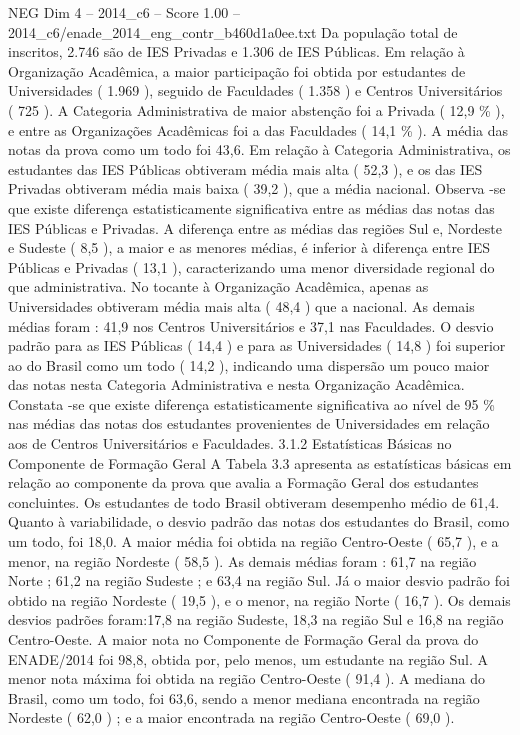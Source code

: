 \begin{textsample}{NEG Dim 4 – 2014\_c6 – Score 1.00 – 2014\_c6/enade\_2014\_eng\_contr\_b460d1a0ee.txt}
Da população total de inscritos, 2.746 são de IES Privadas e 1.306 de IES Públicas.
Em relação à Organização Acadêmica, a maior participação foi obtida por estudantes de Universidades ( 1.969 ), seguido de Faculdades ( 1.358 ) e Centros Universitários ( 725 ).
A Categoria Administrativa de maior abstenção foi a Privada ( 12,9 \% ), e entre as Organizações Acadêmicas foi a das Faculdades ( 14,1 \% ).
A média das notas da prova como um todo foi 43,6.
Em relação à Categoria Administrativa, os estudantes das IES Públicas obtiveram média mais alta ( 52,3 ), e os das IES Privadas obtiveram média mais baixa ( 39,2 ), que a média nacional.
Observa -se que existe diferença estatisticamente significativa entre as médias das notas das IES Públicas e Privadas.
A diferença entre as médias das regiões Sul e, Nordeste e Sudeste ( 8,5 ), a maior e as menores médias, é inferior à diferença entre IES Públicas e Privadas ( 13,1 ), caracterizando uma menor diversidade regional do que administrativa.
No tocante à Organização Acadêmica, apenas as Universidades obtiveram média mais alta ( 48,4 ) que a nacional.
As demais médias foram : 41,9 nos Centros Universitários e 37,1 nas Faculdades.
O desvio padrão para as IES Públicas ( 14,4 ) e para as Universidades ( 14,8 ) foi superior ao do Brasil como um todo ( 14,2 ), indicando uma dispersão um pouco maior das notas nesta Categoria Administrativa e nesta Organização Acadêmica.
Constata -se que existe diferença estatisticamente significativa ao nível de 95 \% nas médias das notas dos estudantes provenientes de Universidades em relação aos de Centros Universitários e Faculdades. 3.1.2 Estatísticas Básicas no Componente de Formação Geral A Tabela 3.3 apresenta as estatísticas básicas em relação ao componente da prova que avalia a Formação Geral dos estudantes concluintes.
Os estudantes de todo Brasil obtiveram desempenho médio de 61,4.
Quanto à variabilidade, o desvio padrão das notas dos estudantes do Brasil, como um todo, foi 18,0.
A maior média foi obtida na região Centro-Oeste ( 65,7 ), e a menor, na região Nordeste ( 58,5 ).
As demais médias foram : 61,7 na região Norte ; 61,2 na região Sudeste ; e 63,4 na região Sul.
Já o maior desvio padrão foi obtido na região Nordeste ( 19,5 ), e o menor, na região Norte ( 16,7 ).
Os demais desvios padrões foram:17,8 na região Sudeste, 18,3 na região Sul e 16,8 na região Centro-Oeste.
A maior nota no Componente de Formação Geral da prova do ENADE/2014 foi 98,8, obtida por, pelo menos, um estudante na região Sul.
A menor nota máxima foi obtida na região Centro-Oeste ( 91,4 ).
A mediana do Brasil, como um todo, foi 63,6, sendo a menor mediana encontrada na região Nordeste ( 62,0 ) ; e a maior encontrada na região Centro-Oeste ( 69,0 ).

\end{textsample}

